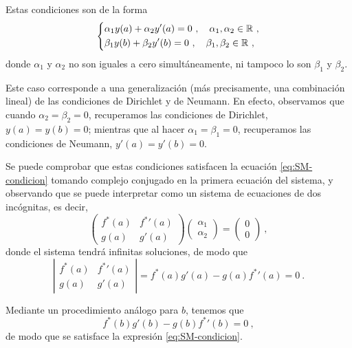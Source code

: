 Estas condiciones son de la forma
\begin{equation}
    \begin{dcases}
        \alpha_1 y(a) + \alpha_2 y'(a) = 0 \ , \quad \alpha_1, \alpha_2 \in \mathbb{R} \ , \\
        \beta_1 y(b) + \beta_2 y'(b) = 0 \ , \quad \beta_1, \beta_2 \in \mathbb{R} \ , 
    \end{dcases}
\end{equation}
donde $\alpha_1$ y $\alpha_2$ no son iguales a cero simultáneamente, ni tampoco lo son $\beta_1$ y $\beta_2$.

Este caso corresponde a una generalización (más precisamente, una combinación lineal) de las condiciones de Dirichlet y de Neumann. En efecto, observamos que cuando $\alpha_2 = \beta_2 = 0$, recuperamos las condiciones de Dirichlet, $y(a) = y(b) = 0$; mientras que al hacer $\alpha_1 = \beta_1 = 0$, recuperamos las condiciones de Neumann, $y'(a) = y'(b) = 0$.

Se puede comprobar que estas condiciones satisfacen la ecuación \eqref{eq:SM-condicion} tomando complejo conjugado en la primera ecuación del sistema, y observando que se puede interpretar como un sistema de ecuaciones de dos incógnitas, es decir,
\begin{equation}
    \begin{pmatrix}
        f^\ast(a) & {f^\ast}'(a) \\ g(a) & g'(a)
    \end{pmatrix}
    \begin{pmatrix}
        \alpha_1 \\ \alpha_2
    \end{pmatrix}
    = 
    \begin{pmatrix}
        0 \\ 0
    \end{pmatrix} \ ,
\end{equation}
donde el sistema tendrá infinitas soluciones, de modo que
\begin{equation}
    \left| \begin{array}{cc}
        f^\ast(a) & {f^\ast}'(a) \\ g(a) & g'(a)
    \end{array}
    \right| = f^\ast(a) g'(a) - g(a) {f^\ast}'(a) = 0 \ .
\end{equation}

Mediante un procedimiento análogo para $b$, tenemos que
\begin{equation}
    f^\ast(b) g'(b) - g(b) {f^\ast}'(b) = 0 \ ,
\end{equation}
de modo que se satisface la expresión \eqref{eq:SM-condicion}.

